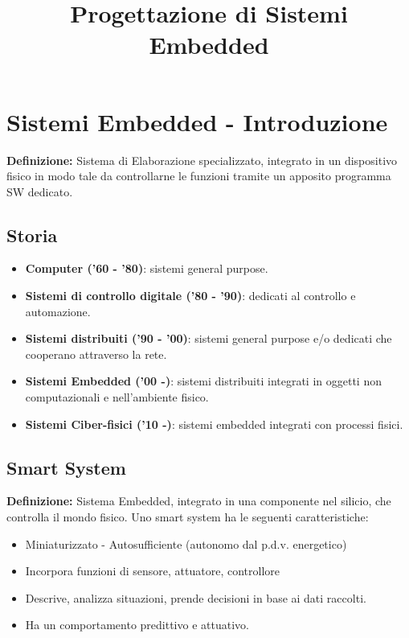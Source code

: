 \documentclass[a4paper]{article}
\title{Progettazione di Sistemi Embedded}
\date{}
\begin{document}
	\begin{frontespizio}
		\Titoletto{}
	\end{frontespizio}

	\tableofcontents
	
	\newpage
	
	\section{Sistemi Embedded - Introduzione}
		\textbf{Definizione:} Sistema di Elaborazione specializzato, integrato in un dispositivo fisico in modo tale da controllarne le funzioni tramite un apposito programma SW dedicato.

	\subsection{Storia}
		\begin{itemize}
			\item \textbf{Computer ('60 - '80)}: sistemi general purpose.
			\item \textbf{Sistemi di controllo digitale ('80 - '90)}: dedicati al controllo e automazione.
			\item \textbf{Sistemi distribuiti ('90 - '00)}: sistemi general purpose e/o dedicati che cooperano attraverso la rete.
			\item \textbf{Sistemi Embedded ('00 -)}: sistemi distribuiti integrati in oggetti non computazionali e nell'ambiente fisico.
			\item \textbf{Sistemi Ciber-fisici ('10 -)}: sistemi embedded integrati con processi fisici.
		\end{itemize}
	
	\subsection{Smart System}
		\textbf{Definizione:} Sistema Embedded, integrato in una componente nel silicio, che controlla il mondo fisico. Uno smart system ha le seguenti caratteristiche:
		\begin{itemize}
			\item Miniaturizzato - Autosufficiente (autonomo dal p.d.v. energetico)
			\item Incorpora funzioni di sensore, attuatore, controllore
			\item Descrive, analizza situazioni, prende decisioni in base ai dati raccolti.
			\item Ha un comportamento predittivo e attuativo.
		\end{itemize}
		
\end{document}
